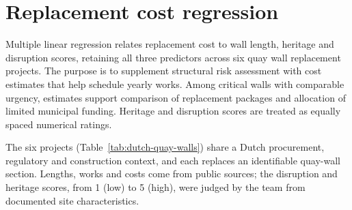 \chapter{Replacement cost regression}
\label{app:cost}

Multiple linear regression relates replacement cost to wall length, heritage and disruption scores, retaining all three predictors across six quay wall replacement projects. The purpose is to supplement structural risk assessment with cost estimates that help schedule yearly works. Among critical walls with comparable urgency, estimates support comparison of replacement packages and allocation of limited municipal funding. Heritage and disruption scores are treated as equally spaced numerical ratings.

The six projects (Table~\ref{tab:dutch-quay-walls}) share a Dutch procurement,
regulatory and construction context, and each replaces an identifiable
quay-wall section. Lengths, works and costs come from public sources; the
disruption and heritage scores, from 1 (low) to 5 (high), were judged by the
team from documented site characteristics.

